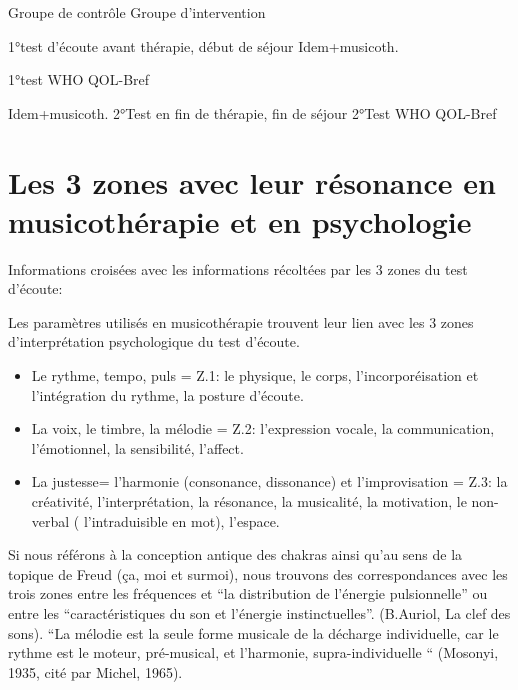         
        Groupe de contrôle                                                    Groupe
                                                                                     d'intervention

1°test d'écoute avant thérapie, début de séjour           Idem+musicoth.

1°test WHO QOL-Bref

                                                                                     Idem+musicoth.
2°Test en fin de thérapie, fin de séjour
2°Test WHO QOL-Bref
 



\section{Les 3 zones avec leur résonance en musicothérapie et en
  psychologie}


	Informations croisées avec les informations récoltées par les 3 
          zones du test d'écoute:
          
Les paramètres utilisés en musicothérapie trouvent leur lien avec les
3 zones d'interprétation psychologique du test d'écoute.
\begin{itemize}
 \item Le rythme, tempo, puls  =  Z.1: le physique, le corps, l'incorporéisation et
l'intégration du rythme,
la posture d'écoute.

\item La voix, le timbre, la mélodie =  Z.2:  l'expression vocale, la communication,
l'émotionnel, la sensibilité, l'affect.

\item La justesse= l'harmonie (consonance, dissonance) et l'improvisation = Z.3:  la créativité, l'interprétation, la
résonance, la musicalité, la motivation, le non-verbal (
l'intraduisible en mot), l'espace.
\end{itemize}

Si nous référons à la conception antique des chakras ainsi qu'au sens de la
topique de Freud (ça, moi et surmoi), nous trouvons des correspondances
avec les trois zones entre les
fréquences et ``la distribution de l'énergie pulsionnelle'' ou entre
les 
``caractéristiques du son et l'énergie instinctuelles''. (B.Auriol, La
clef des sons).
``La mélodie est la seule forme musicale de la décharge individuelle, car le rythme est le moteur, pré-musical, et l'harmonie, supra-individuelle `` (Mosonyi, 1935, cité par Michel, 1965).

